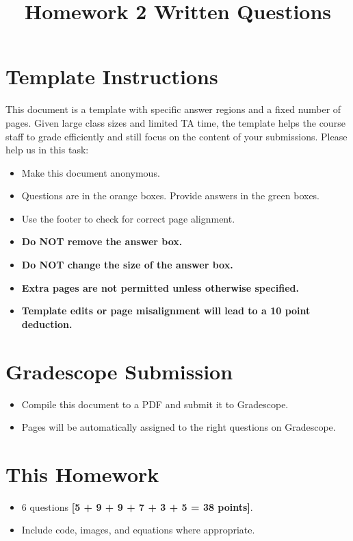 \documentclass[11pt]{article}
\date{}
\title{\vspace{-1cm}Homework 2 Written Questions}
\begin{document}
\maketitle
\thispagestyle{fancy}

\section*{Template Instructions}

This document is a template with specific answer regions and a fixed number of pages. Given large class sizes and limited TA time, the template helps the course staff to grade efficiently and still focus on the content of your submissions. Please help us in this task:
 
\begin{itemize}
  \item Make this document anonymous.
  
  \item Questions are in the orange boxes. Provide answers in the green boxes.
  \item Use the footer to check for correct page alignment.

  \item \textbf{Do NOT remove the answer box.}
  \item \textbf{Do NOT change the size of the answer box.}
  \item \textbf{Extra pages are not permitted unless otherwise specified.}
  \item \textbf{Template edits or page misalignment will lead to a 10 point deduction.}
\end{itemize}

\section*{Gradescope Submission}
\begin{itemize}
  \item Compile this document to a PDF and submit it to Gradescope.
  \item Pages will be automatically assigned to the right questions on Gradescope.
\end{itemize}

\section*{This Homework}
\begin{itemize}
    \item 6 questions \textbf{[5 + 9 + 9 + 7 + 3 + 5 = 38 points]}.
    \item Include code, images, and equations where appropriate.
\end{itemize}
\end{document}
